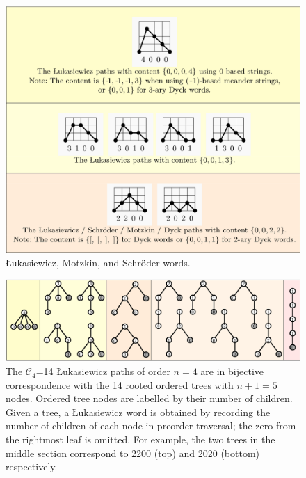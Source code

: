 \begin{figure}[]
	\centering
	\includegraphics[width = .95 \textwidth]{paths.png}
	\caption{Łukasiewicz, Motzkin, and Schröder words.}
	\label{fig:paths}
\end{figure}




\begin{figure}[]
	\centering
	\includegraphics[width = .95 \textwidth]{trees.png}
	\caption{The $\mathcal{C}_4$=14 Łukasiewicz paths of order $n=4$ are in bijective correspondence with the 14 rooted ordered trees with $n+1=5$ nodes.  Ordered tree nodes are labelled by their number of children.  Given a tree, a Łukasiewicz word is obtained by recording the number of children of each node in preorder traversal; the zero from the rightmost leaf is omitted.  For example, the two trees in the middle section correspond to 2200 (top) and 2020 (bottom) respectively.}
	\label{fig:lukatrees}
\end{figure}


